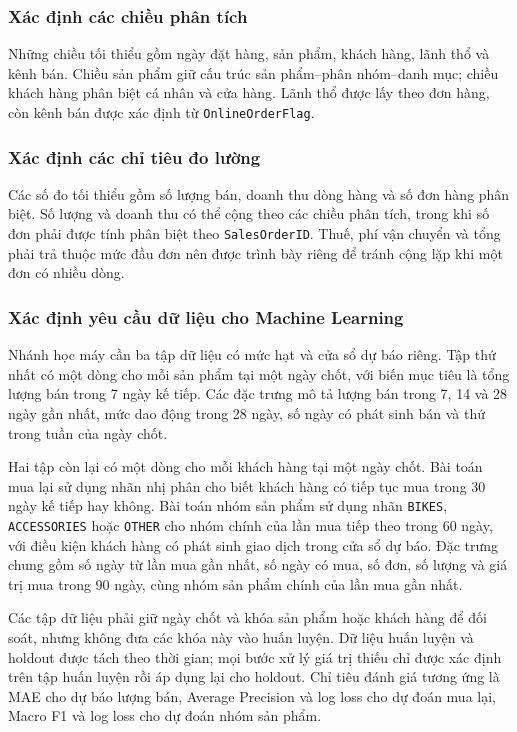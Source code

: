 \subsubsection{Xác định các chiều phân tích}
Những chiều tối thiểu gồm ngày đặt hàng, sản phẩm, khách hàng, lãnh thổ và kênh bán. Chiều sản phẩm giữ cấu trúc sản phẩm--phân nhóm--danh mục; chiều khách hàng phân biệt cá nhân và cửa hàng. Lãnh thổ được lấy theo đơn hàng, còn kênh bán được xác định từ \texttt{OnlineOrderFlag}.
\subsubsection{Xác định các chỉ tiêu đo lường}
Các số đo tối thiểu gồm số lượng bán, doanh thu dòng hàng và số đơn hàng phân biệt. Số lượng và doanh thu có thể cộng theo các chiều phân tích, trong khi số đơn phải được tính phân biệt theo \texttt{SalesOrderID}. Thuế, phí vận chuyển và tổng phải trả thuộc mức đầu đơn nên được trình bày riêng để tránh cộng lặp khi một đơn có nhiều dòng.
\clearpage
\subsubsection{Xác định yêu cầu dữ liệu cho Machine Learning}
Nhánh học máy cần ba tập dữ liệu có mức hạt và cửa sổ dự báo riêng. Tập thứ nhất có một dòng cho mỗi sản phẩm tại một ngày chốt, với biến mục tiêu là tổng lượng bán trong 7 ngày kế tiếp. Các đặc trưng mô tả lượng bán trong 7, 14 và 28 ngày gần nhất, mức dao động trong 28 ngày, số ngày có phát sinh bán và thứ trong tuần của ngày chốt.

Hai tập còn lại có một dòng cho mỗi khách hàng tại một ngày chốt. Bài toán mua lại sử dụng nhãn nhị phân cho biết khách hàng có tiếp tục mua trong 30 ngày kế tiếp hay không. Bài toán nhóm sản phẩm sử dụng nhãn \texttt{BIKES}, \texttt{ACCESSORIES} hoặc \texttt{OTHER} cho nhóm chính của lần mua tiếp theo trong 60 ngày, với điều kiện khách hàng có phát sinh giao dịch trong cửa sổ dự báo. Đặc trưng chung gồm số ngày từ lần mua gần nhất, số ngày có mua, số đơn, số lượng và giá trị mua trong 90 ngày, cùng nhóm sản phẩm chính của lần mua gần nhất.

Các tập dữ liệu phải giữ ngày chốt và khóa sản phẩm hoặc khách hàng để đối soát, nhưng không đưa các khóa này vào huấn luyện. Dữ liệu huấn luyện và holdout được tách theo thời gian; mọi bước xử lý giá trị thiếu chỉ được xác định trên tập huấn luyện rồi áp dụng lại cho holdout. Chỉ tiêu đánh giá tương ứng là MAE cho dự báo lượng bán, Average Precision và log loss cho dự đoán mua lại, Macro F1 và log loss cho dự đoán nhóm sản phẩm.

